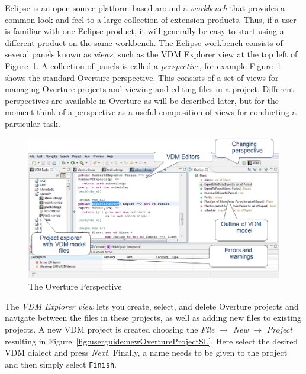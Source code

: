 \documentclass{overturerepchap}
\begin{document}
Eclipse is an open source platform based around a
\emph{workbench} that provides a common look and feel
to a large collection of extension products. Thus, if a user is
familiar with one Eclipse product, it will generally be easy to start
using a different product on the same workbench. The Eclipse workbench
consists of several panels known as \emph{views}, such as
the VDM Explorer view at the top left of
Figure~\ref{fig:userguire:OverturePerspective}. A collection of panels
is called a \emph{perspective}, for example
Figure~\ref{fig:userguire:OverturePerspective} shows the standard
Overture perspective. This consists of a set of views for managing
Overture projects and viewing and editing files in a
project. Different perspectives are available in Overture as will be
described later, but for the moment think of a perspective as a
useful composition of views for conducting a particular task.

\begin{figure}[!h]
\begin{center}
  \includegraphics[width=\textwidth]{figures/OverturePerspective}
  \caption[labelInTOC]{The Overture Perspective}
  \label{fig:userguire:OverturePerspective}
\end{center}
\end{figure}

The \emph{VDM Explorer view} lets you create, select, 
and delete Overture projects and navigate between the files in these 
projects, as well as adding new files to existing projects. A new VDM
project is created choosing the \emph{File} $ \rightarrow$ \emph{New}
$\rightarrow$ \emph{Project} resulting in
Figure~\ref{fig:userguide:newOvertureProjectSL}. Here select
the desired VDM dialect and press \emph{Next}. Finally, a name needs 
to be given to the project and then simply select \texttt{Finish}. 
\end{document}
